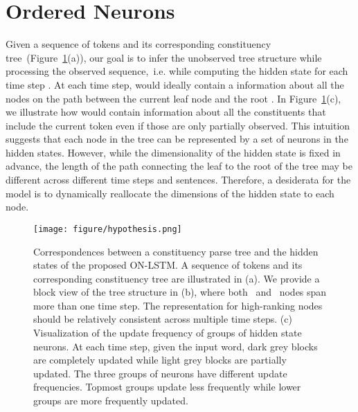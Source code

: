\documentclass{article} \usepackage{iclr2019_conference,times}
\begin{document}
\section{Ordered Neurons}
Given a sequence of tokens  and its corresponding constituency tree~(Figure~\ref{fig:tree}(a)), our goal is to infer the unobserved tree structure while processing the observed sequence,~i.e. while computing the hidden state  for each time step .
At each time step,  would ideally contain a information about all the nodes on the path between the current leaf node  and the root . In Figure~\ref{fig:tree}(c), we illustrate how  would contain information about all the constituents that include the current token  even if those are only partially observed.
This intuition suggests that each node in the tree can be represented by a set of neurons in the hidden states. However, while the dimensionality of the hidden state is fixed in advance, the length of the path connecting the leaf to the root of the tree may be different across different time steps and sentences. Therefore, a desiderata for the model is to dynamically reallocate the dimensions of the hidden state to each node.
\begin{figure}[t]
\centering
\texttt{[image: figure/hypothesis.png]}
\caption{Correspondences between a constituency parse tree and the hidden states of the proposed ON-LSTM.
A sequence of tokens  and its corresponding constituency tree are illustrated in (a).
We provide a block view of the tree structure in (b), where both~ and~ nodes span more than one time step.
The representation for high-ranking nodes should be relatively consistent across multiple time steps.
(c) Visualization of the update frequency of groups of hidden state neurons. At each time step, given the input word, dark grey blocks are completely updated while light grey blocks are partially updated.
The three groups of neurons have different update frequencies. Topmost groups update less frequently while lower groups are more frequently updated.
}
\label{fig:tree}
\end{figure}
\end{document}
